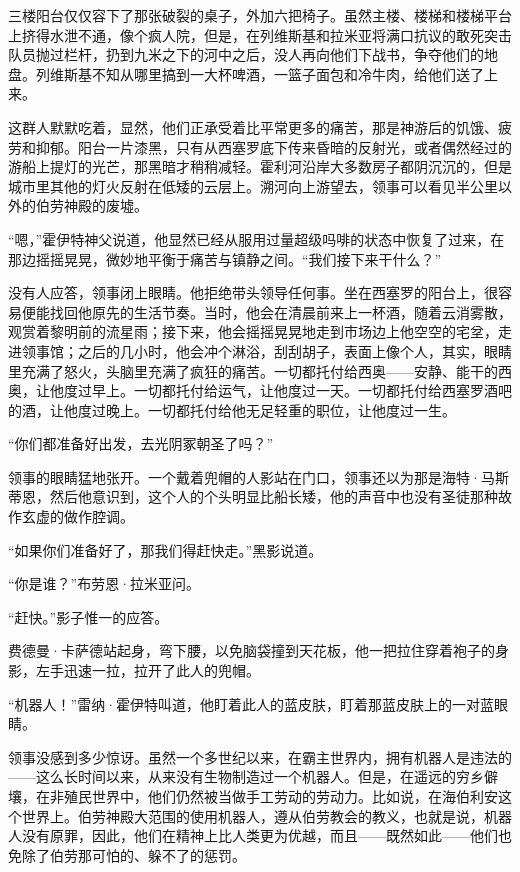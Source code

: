 \documentclass[AutoFakeBold=true]{book}
\begin{document}
\vspace*{1em}

三楼阳台仅仅容下了那张破裂的桌子，外加六把椅子。虽然主楼、楼梯和楼梯平台上挤得水泄不通，像个疯人院，但是，在列维斯基和拉米亚将满口抗议的敢死突击队员抛过栏杆，扔到九米之下的河中之后，没人再向他们下战书，争夺他们的地盘。列维斯基不知从哪里搞到一大杯啤酒，一篮子面包和冷牛肉，给他们送了上来。

这群人默默吃着，显然，他们正承受着比平常更多的痛苦，那是神游后的饥饿、疲劳和抑郁。阳台一片漆黑，只有从西塞罗底下传来昏暗的反射光，或者偶然经过的游船上提灯的光芒，那黑暗才稍稍减轻。霍利河沿岸大多数房子都阴沉沉的，但是城市里其他的灯火反射在低矮的云层上。溯河向上游望去，领事可以看见半公里以外的伯劳神殿的废墟。

``嗯，''霍伊特神父说道，他显然已经从服用过量超级吗啡的状态中恢复了过来，在那边摇摇晃晃，微妙地平衡于痛苦与镇静之间。``我们接下来干什么？''

没有人应答，领事闭上眼睛。他拒绝带头领导任何事。坐在西塞罗的阳台上，很容易便能找回他原先的生活节奏。当时，他会在清晨前来上一杯酒，随着云消雾散，观赏着黎明前的流星雨；接下来，他会摇摇晃晃地走到市场边上他空空的宅坌，走进领事馆；之后的几小时，他会冲个淋浴，刮刮胡子，表面上像个人，其实，眼睛里充满了怒火，头脑里充满了疯狂的痛苦。一切都托付给西奥——安静、能干的西奥，让他度过早上。一切都托付给运气，让他度过一天。一切都托付给西塞罗酒吧的酒，让他度过晚上。一切都托付给他无足轻重的职位，让他度过一生。

``你们都准备好出发，去光阴冢朝圣了吗？''

领事的眼睛猛地张开。一个戴着兜帽的人影站在门口，领事还以为那是海特·马斯蒂恩，然后他意识到，这个人的个头明显比船长矮，他的声音中也没有圣徒那种故作玄虚的做作腔调。

``如果你们准备好了，那我们得赶快走。''黑影说道。

``你是谁？''布劳恩·拉米亚问。

``赶快。''影子惟一的应答。

费德曼·卡萨德站起身，弯下腰，以免脑袋撞到天花板，他一把拉住穿着袍子的身影，左手迅速一拉，拉开了此人的兜帽。

``机器人！''雷纳·霍伊特叫道，他盯着此人的蓝皮肤，盯着那蓝皮肤上的一对蓝眼睛。

领事没感到多少惊讶。虽然一个多世纪以来，在霸主世界内，拥有机器人是违法的——这么长时间以来，从来没有生物制造过一个机器人。但是，在遥远的穷乡僻壤，在非殖民世界中，他们仍然被当做手工劳动的劳动力。比如说，在海伯利安这个世界上。伯劳神殿大范围的使用机器人，遵从伯劳教会的教义，也就是说，机器人没有原罪，因此，他们在精神上比人类更为优越，而且——既然如此——他们也免除了伯劳那可怕的、躲不了的惩罚。
\end{document}
